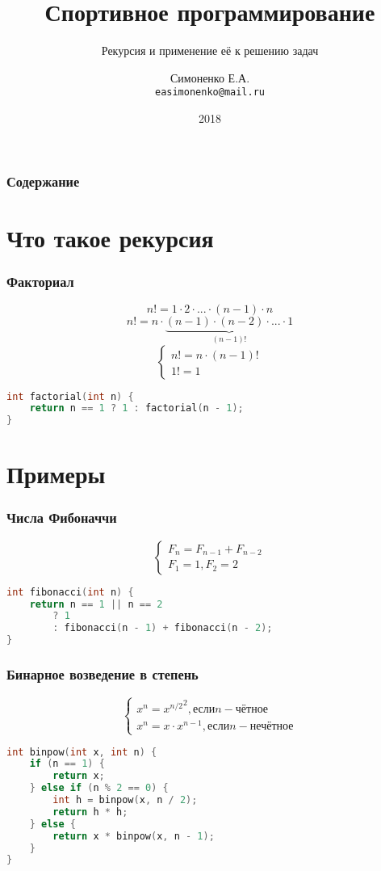 \documentclass[11pt]{beamer}
\begin{document}
\author{Симоненко Е.А. \\ \texttt{easimonenko@mail.ru}}
\title{Спортивное программирование}
\subtitle{Рекурсия и применение её к решению задач}
\date{2018}

\begin{frame}
\titlepage
\end{frame}

\begin{frame}
\frametitle{Содержание}
\tableofcontents
\end{frame}

\section{Что такое рекурсия}

\begin{frame}[fragile]
\frametitle{Факториал}
\[n! = 1 \cdot 2 \cdot ... \cdot (n - 1) \cdot n\]
\[n! = n \cdot \underbrace{(n - 1) \cdot (n - 2) \cdot ... \cdot 1}_{(n - 1)!}\]
\[ \left\{
\begin{array}{l}
n! = n \cdot (n - 1)! \\
1! = 1
\end{array}
\right. \]
\begin{lstlisting}[frame=single,language=c]
int factorial(int n) {
    return n == 1 ? 1 : factorial(n - 1);
}
\end{lstlisting}
\end{frame}

\section{Примеры}

\begin{frame}[fragile]
\frametitle{Числа Фибоначчи}
\[\left\{
\begin{array}{l}
F_n = F_{n - 1} + F_{n - 2} \\
F_1 = 1, F_2 = 2
\end{array}
\right.\]
\begin{lstlisting}[frame=single,language=c]
int fibonacci(int n) {
    return n == 1 || n == 2
        ? 1
        : fibonacci(n - 1) + fibonacci(n - 2);
}
\end{lstlisting}
\end{frame}

\begin{frame}[fragile]
\frametitle{Бинарное возведение в степень}
\[\left\{
\begin{array}{l}
x^n = {x^{n / 2}}^2, \text{если} n - \text{чётное} \\
x^n = x \cdot x^{n - 1}, \text{если} n - \text{нечётное}
\end{array}
\right.\]
\begin{lstlisting}[frame=single,language=c]
int binpow(int x, int n) {
    if (n == 1) {
        return x;
    } else if (n % 2 == 0) {
        int h = binpow(x, n / 2);
        return h * h;
    } else {
        return x * binpow(x, n - 1);
    }
}
\end{lstlisting}
\end{frame}
\end{document}
